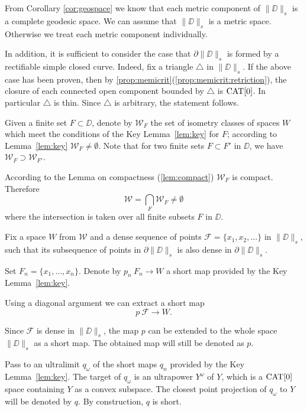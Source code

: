 \documentclass{article}
\begin{document}
From Corollary \ref{cor:geospace} we know that each metric component of $\|\DD\|_s$ is a complete geodesic space.
We can assume that $\|\DD\|_s$ is a metric space.
Otherwise we treat each metric component 
individually.

In addition, it is sufficient to consider
the case that $\partial \|\DD\|_s$ is formed by a rectifiable simple closed curve.
Indeed, fix a triangle $\triangle$ in $\|\DD\|_s$. 
If the above case has been proven, then by \ref{prop:memicrit}(\ref{prop:memicrit:retriction}),
the closure of each connected open component bounded by $\triangle$ is $\mathop{\rm CAT}\nolimits[0]$.
In particular $\triangle$ is thin.
Since $\triangle$ is arbitrary, the statement follows.


Given a finite set $F\subset \DD$,
denote by $\mathcal{W}_F$
the set of isometry classes of spaces $W$ which meet the conditions of the Key Lemma~\ref{lem:key}
for $F$;
according to Lemma~\ref{lem:key} $\mathcal{W}_F\ne\emptyset$.
Note that for two finite sets $F\subset F'$ in $\DD$,
we have $\mathcal{W}_F\supset \mathcal{W}_{F'}$.

According to the Lemma on compactness (\ref{lem:compact}) $\mathcal{W}_F$ is compact.
Therefore 
\[\mathcal{W}
=
\bigcap_{F}\mathcal{W}_F\ne \emptyset\]
where the intersection is taken over all finite subsets $F$ in $\DD$. 

Fix a space $W$ from $\mathcal{W}$
and a dense sequence of points $\mathcal{F}=\{x_1,x_2,\dots\}$ in $\|\DD\|_s$, 
such that its subsequence of points in $\partial \|\DD\|_s$ is
 also dense in $\partial \|\DD\|_s$.

Set $F_n=\{x_1,\dots,x_n\}$.
Denote by $p_n\:F_n\to W$ a short map provided by the Key Lemma~\ref{lem:key}.

Using a diagonal argument we can extract a short map 
\[p\:\mathcal{F}\to W.\]

Since $\mathcal{F}$ is dense in $\|\DD\|_s$,
the map $p$ can be extended to the whole space $\|\DD\|_s$ 
as a short map.
The obtained map will still be denoted as $p$.

Pass to an ultralimit $q_\omega$ of the short maps $q_n$ provided by the Key Lemma~\ref{lem:key}.
The target of $q_\omega$ is an ultrapower  $Y^\omega$ of $Y$,
which is a $\mathop{\rm CAT}\nolimits[0]$ space containing $Y$ as a convex subspace.
The closest point projection of $q_\omega$ to $Y$ will be denoted by $q$.
By construction, $q$ is short.
\end{document}
